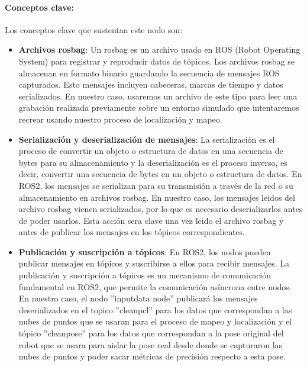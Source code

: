 \documentclass[12pt, a4paper, twoside]{article}
\begin{document}
\paragraph{Conceptos clave:}
Los conceptos clave que sustentan este nodo son:
\begin{itemize}
  \item \textbf{Archivos rosbag}: Un rosbag es un archivo usado en ROS (Robot Operating System) para registrar y reproducir datos de tópicos. Los 
  archivos rosbag se almacenan en formato binario guardando la secuencia de mensajes ROS capturados. Esto mensajes incluyen cabeceras, marcas de tiempo 
  y datos serializados. En nuestro caso, usaremos un archivo de este tipo para leer una grabación realizada previamente sobre un entorno simulado que 
  intentaremos recrear usando nuestro proceso de localización y mapeo.
  \item \textbf{Serialización y deserialización de mensajes}: La serialización es el proceso de convertir un objeto o estructura de datos en una secuencia 
  de bytes para su almacenamiento y la deserialización es el proceso inverso, es decir, convertir una secuencia de bytes en un objeto o estructura de datos. 
  En ROS2, los mensajes se serializan para su transmisión a través de la red o su almacenamiento en archivos rosbag. En nuestro caso, los mensajes leidos del 
  archivo rosbag vienen serializados, por lo que es necesario deserializarlos antes de poder usarlos. Esta acción sera clave una vez leido el archivo rosbag 
  y antes de publicar los mensajes en los tópicos correspondientes.
  \item \textbf{Publicación y suscripción a tópicos}: En ROS2, los nodos pueden publicar mensajes en tópicos y suscribirse a ellos para recibir mensajes.
  La publicación y suscripción a tópicos es un mecanismo de comunicación fundamental en ROS2, que permite la comunicación asíncrona entre nodos. En nuestro caso, 
  el nodo ''input\textunderscore data \textunderscore node'' publicará los mensajes deserializados en el topico ''clean\textunderscore pcl'' para los datos que 
  correspondan a las nubes de puntos que se usaran para el proceso de mapeo y localización y el tópico ''clean\textunderscore pose'' para los datos que correspondan 
  a la pose original del robot que se usara para aislar la pose real desde donde se capturaron las nubes de puntos y poder sacar métricas de precisión respecto a 
  esta pose.  
\end{itemize}
\end{document}

